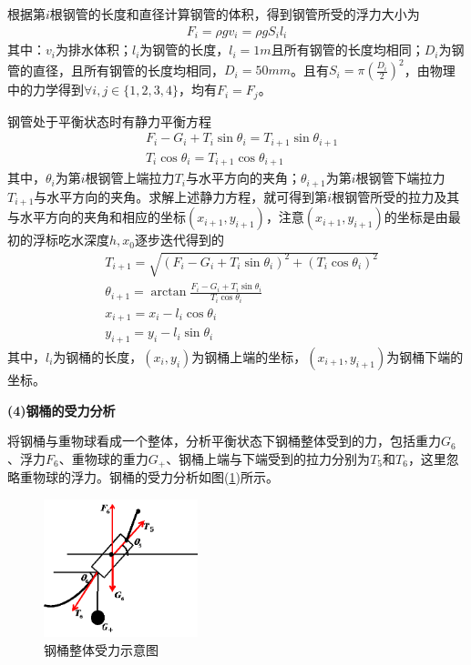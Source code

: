 \documentclass[UTF8]{ctexbook}
\theoremstyle{nonumberplain}
\begin{document}
            \par
            根据第$i$根钢管的长度和直径计算钢管的体积，得到钢管所受的浮力大小为
            \begin{align*}
            F_i = \rho g v_i = \rho g S_i l_i
            \end{align*}
            其中：$v_i$为排水体积；$l_i$为钢管的长度，$l_i = 1m$且所有钢管的长度均相同；$D_i$为钢管的直径，且所有钢管的长度均相同，$D_i = 50mm $。且有$S_i = \pi \left( \frac{D_i}{2} \right)^2 $，由物理中的力学得到$\forall i,j\in \{1,2,3,4\}$，均有$F_i = F_j$。
            \par
            钢管处于平衡状态时有静力平衡方程
            \begin{align*}
            & F_i - G_i + T_i\sin \theta_i = T_{i+1}\sin \theta_{i+1}\\
            & T_{i}\cos \theta_i = T_{i+1}\cos \theta_{i+1}
            \end{align*}
            其中，$\theta_i$为第$i$根钢管上端拉力$T_i$与水平方向的夹角；$\theta_{i+1}$为第$i$根钢管下端拉力$T_{i+1}$与水平方向的夹角。求解上述静力方程，就可得到第$i$根钢管所受的拉力及其与水平方向的夹角和相应的坐标$(x_{i+1},y_{i+1})$，注意$(x_{i+1},y_{i+1})$的坐标是由最初的浮标吃水深度$h,x_0$逐步迭代得到的
            \begin{align*}
            & T_{i+1} = \sqrt{(F_{i}-G_i + T_i\sin \theta_i)^2+(T_i\cos \theta_i)^2}\\
            & \theta_{i+1} = \arctan\frac{F_i - G_i + T_i \sin \theta_i}{T_i\cos \theta_i}\\
            & x_{i+1} = x_i - l_i\cos\theta_i\\
            & y_{i+1} = y_i - l_i\sin \theta_i
            \end{align*}
            其中，$l_i$为钢桶的长度，$(x_i,y_i)$为钢桶上端的坐标，$(x_{i+1},y_{i+1})$为钢桶下端的坐标。
            \par
            \textbf{(4)钢桶的受力分析}
            \par
            将钢桶与重物球看成一个整体，分析平衡状态下钢桶整体受到的力，包括重力$G_6$、浮力$F_6$、重物球的重力$G_+$、钢桶上端与下端受到的拉力分别为$T_5$和$T_6$，这里忽略重物球的浮力。钢桶的受力分析如图(\ref{fig:钢桶整体受力示意图})所示。
            \begin{figure}[H]
            \centering
            \includegraphics[height=4cm]{images/steel_drums_force_analysis.jpg}
            \caption{钢桶整体受力示意图}
            \label{fig:钢桶整体受力示意图}
            \end{figure}
\end{document}
